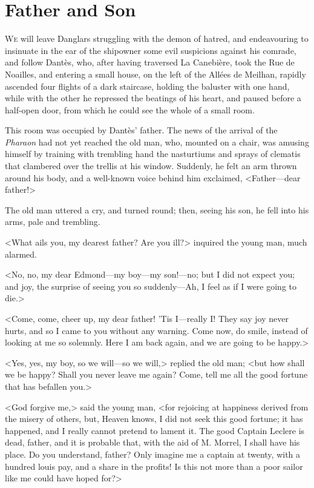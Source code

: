 \chapter{Father and Son} 

 \lettrine{W}{e} will leave Danglars struggling with the demon of hatred, and endeavouring to insinuate in the ear of the shipowner some evil suspicions against his comrade, and follow Dantès, who, after having traversed La Canebière, took the Rue de Noailles, and entering a small house, on the left of the Allées de Meilhan, rapidly ascended four flights of a dark staircase, holding the baluster with one hand, while with the other he repressed the beatings of his heart, and paused before a half-open door, from which he could see the whole of a small room. 

 This room was occupied by Dantès' father. The news of the arrival of the \textit{Pharaon} had not yet reached the old man, who, mounted on a chair, was amusing himself by training with trembling hand the nasturtiums and sprays of clematis that clambered over the trellis at his window. Suddenly, he felt an arm thrown around his body, and a well-known voice behind him exclaimed, <Father—dear father!> 

 The old man uttered a cry, and turned round; then, seeing his son, he fell into his arms, pale and trembling. 

 <What ails you, my dearest father? Are you ill?> inquired the young man, much alarmed. 

 <No, no, my dear Edmond—my boy—my son!—no; but I did not expect you; and joy, the surprise of seeing you so suddenly—Ah, I feel as if I were going to die.> 

 <Come, come, cheer up, my dear father! 'Tis I—really I! They say joy never hurts, and so I came to you without any warning. Come now, do smile, instead of looking at me so solemnly. Here I am back again, and we are going to be happy.> 

 <Yes, yes, my boy, so we will—so we will,> replied the old man; <but how shall we be happy? Shall you never leave me again? Come, tell me all the good fortune that has befallen you.> 

 <God forgive me,> said the young man, <for rejoicing at happiness derived from the misery of others, but, Heaven knows, I did not seek this good fortune; it has happened, and I really cannot pretend to lament it. The good Captain Leclere is dead, father, and it is probable that, with the aid of M. Morrel, I shall have his place. Do you understand, father? Only imagine me a captain at twenty, with a hundred louis pay, and a share in the profits! Is this not more than a poor sailor like me could have hoped for?> 

